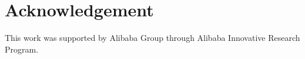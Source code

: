 \section*{Acknowledgement}
This work was supported by Alibaba Group through Alibaba Innovative Research Program. 
